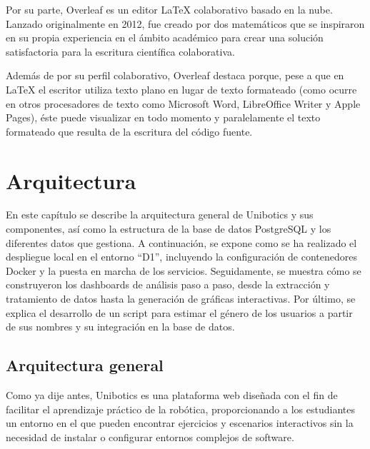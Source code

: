 \documentclass[a4paper, 12pt]{book}
\begin{document}
Por su parte, Overleaf es un editor LaTeX colaborativo basado en la nube. Lanzado originalmente en 2012, fue creado por dos matemáticos que se inspiraron en su propia experiencia en el ámbito académico para crear una solución satisfactoria para la escritura científica colaborativa.

Además de por su perfil colaborativo, Overleaf destaca porque, pese a que en LaTeX el escritor utiliza texto plano en lugar de texto formateado (como ocurre en otros procesadores de texto como Microsoft Word, LibreOffice Writer y Apple Pages), éste puede visualizar en todo momento y paralelamente el texto formateado que resulta de la escritura del código fuente.

\cleardoublepage


\chapter{Arquitectura}
\label{chap:diseño}


En este capítulo se describe la arquitectura general de Unibotics y sus componentes, así como la estructura de la base de datos PostgreSQL y los diferentes datos que gestiona. A continuación, se expone como se ha realizado el despliegue local en el entorno “D1”, incluyendo la configuración de contenedores Docker y la puesta en marcha de los servicios. Seguidamente, se muestra cómo se construyeron los dashboards de análisis paso a paso, desde la extracción y tratamiento de datos hasta la generación de gráficas interactivas. Por último, se explica el desarrollo de un script para estimar el género de los usuarios a partir de sus nombres y su integración en la base de datos.

\section{Arquitectura general} 
\label{sec:arquitectura}

Como ya dije antes, Unibotics es una plataforma web diseñada con el fin de facilitar el aprendizaje práctico de la robótica, proporcionando a los estudiantes un entorno en el que pueden encontrar ejercicios y escenarios interactivos sin la necesidad de instalar o configurar entornos complejos de software.
\end{document}
